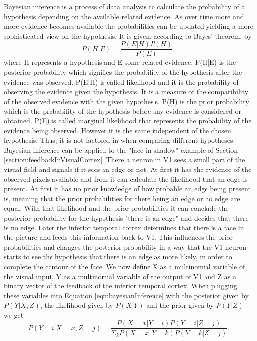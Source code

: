 Bayesian inference is a process of data analysis to calculate the probability of a hypothesis depending on the available related evidence. As over time more and more evidence becomes available the probabilities can be updated yielding a more sophisticated view on the hypothesis. It is given, according to Bayes' theorem, by
\begin{equation}
\label{eqn:bayesianInference}
P(H|E) = \frac{P(E|H)P(H)}{P(E)},
\end{equation}
where H represents a hypothesis and E some related evidence. P(H|E) is the posterior probability which signifies the probability of the hypothesis after the evidence was observed. P(E|H) is called likelihood and it is the probability of observing the evidence 	given the hypothesis. It is a measure of the compatibility of the observed evidence with the given hypothesis. P(H) is the prior probability which is the probability of the hypothesis before any evidence is considered or obtained. P(E) is called marginal likelihood that represents the probability of the evidence being observed. However it is the same independent of the chosen hypothesis. Thus, it is not factored in when comparing different hypotheses.
Bayesian inference can be applied to the "face in shadow" example of Section \ref{section:feedbackInVisualCortex}. There a neuron in V1 sees a small part of the visual field and signals if it sees an edge or not. At first it has the evidence of the observed pixels available and from it can calculate the likelihood that an edge is present. At first it has no prior knowledge of how probable an edge being present is, meaning that the prior probabilities for there being an edge or no edge are equal. With that likelihood and the prior probabilities it can conclude the posterior probability for the hypothesis "there is an edge" and decides that there is no edge.
Later the inferior temporal cortex determines that there is a face in the picture and feeds this information back to V1. This influences the prior probabilities and changes the posterior probability in a way that the V1 neuron starts to see the hypothesis that there is an edge as more likely, in order to complete the contour of the face. 
We now define X as a multinomial variable of the visual input, Y as a multinomial variable of the output of V1 and Z as a binary vector of the feedback of the inferior temporal cortex.
When plugging these variables into Equation \ref{eqn:bayesianInference} with the posterior given by $P(Y|X,Z)$, the likelihood given by $P(X|Y)$ and the prior given by $P(Y|Z)$ we get
\begin{equation}
\label{eqn:pYvorausgesetztXUndZ}
P(Y = i|X = x, Z = j) = \frac{P(X=x|Y=i)P(Y = i|Z = j)}{\Sigma_{k}P(X=x,Y=k)P(Y=k|Z=j)}.
\end{equation}

